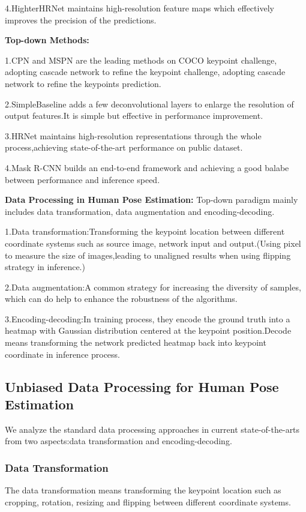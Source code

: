 \documentclass[11pt]{article}
\begin{document}
\noindent 4.HighterHRNet maintains high-resolution feature maps which effectively improves the precision of the predictions.

\textbf{Top-down Methods:}

\noindent 1.CPN and MSPN are the leading methods on COCO keypoint challenge, adopting cascade network to refine the keypoint challenge, adopting cascade network to refine the keypoints prediction.

\noindent 2.SimpleBaseline adds a few deconvolutional layers to enlarge the resolution of output features.It is simple but effective in performance improvement.

\noindent 3.HRNet maintains high-resolution representations through the whole process,achieving state-of-the-art performance on public dataset.

\noindent 4.Mask R-CNN builds an end-to-end framework and achieving a good balabe between performance and inference speed.

\textbf{Data Processing in Human Pose Estimation:}
Top-down paradigm mainly includes data transformation, data augmentation and encoding-decoding.

\noindent 1.Data transformation:Transforming the keypoint location between different coordinate systems such as source image, network input and output.(Using pixel to measure the size of images,leading to unaligned results when using flipping strategy in inference.)

\noindent 2.Data augmentation:A common strategy for increasing the diversity of samples, which can do help to enhance the robustness of the algorithms.

\noindent 3.Encoding-decoding:In training process, they encode the ground truth into a heatmap with Gaussian distribution centered at the keypoint position.Decode means transforming the network predicted heatmap back into keypoint coordinate in inference process.

\subsection{Unbiased Data Processing for Human Pose Estimation}
We analyze the standard data processing approaches in current state-of-the-arts from two aspects:data transformation and encoding-decoding.
\subsubsection{Data Transformation}
The data transformation means transforming the keypoint location such as cropping, rotation, resizing and flipping between different coordinate systems.
\end{document}

